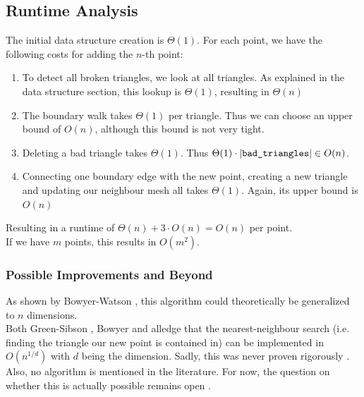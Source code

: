 \subsection{Runtime Analysis}
The initial data structure creation is $\Theta(1)$. For each point, we have the following costs for adding the $n$-th point:
\begin{enumerate}
    \item To detect all broken triangles, we look at all triangles. As explained in the data structure section, this lookup is $\Theta(1)$, resulting in $\Theta(n)$
    \item The boundary walk takes $\Theta(1)$ per triangle. Thus we can choose an upper bound of $O(n)$, although this bound is not very tight.
    \item Deleting a bad triangle takes $\Theta(1)$. Thus $\Theta(1) \cdot |\text{\texttt{bad\_triangles}}| \in O(n)$.
    \item Connecting one boundary edge with the new point, creating a new triangle and updating our neighbour mesh all takes $\Theta(1)$. Again, its upper bound is $O(n)$
\end{enumerate}
Resulting in a runtime of $\Theta(n) + 3 \cdot O(n) = O(n)$ per point.\\
If we have $m$ points, this results in $O(m^2)$.
\subsubsection{Possible Improvements and Beyond}
As shown by Bowyer-Watson \cite{Bowyer1981} \cite{Watson1981}, this algorithm could theoretically be generalized to $n$ dimensions.\\
Both Green-Sibson \cite{Green1978}, Bowyer \cite{Bowyer1981} and \cite{Rebay1993} alledge that the nearest-neighbour search (i.e. finding the triangle our new point is contained in) can be implemented in $O(n^{1/d})$ with $d$ being the dimension. Sadly, this was never proven rigorously \cite{FORTUNE1995}. Also, no algorithm is mentioned in the literature. For now, the question on whether this is actually possible remains open \cite{CSSE}.